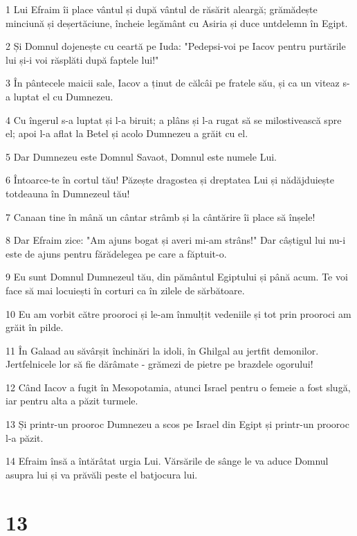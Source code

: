 \par 1 Lui Efraim îi place vântul și după vântul de răsărit aleargă; grămădește minciună și deșertăciune, încheie legământ cu Asiria și duce untdelemn în Egipt.
\par 2 Și Domnul dojenește cu ceartă pe Iuda: "Pedepsi-voi pe Iacov pentru purtările lui și-i voi răsplăti după faptele lui!"
\par 3 În pântecele maicii sale, Iacov a ținut de călcâi pe fratele său, și ca un viteaz s-a luptat el cu Dumnezeu.
\par 4 Cu îngerul s-a luptat și l-a biruit; a plâns și l-a rugat să se milostivească spre el; apoi l-a aflat la Betel și acolo Dumnezeu a grăit cu el.
\par 5 Dar Dumnezeu este Domnul Savaot, Domnul este numele Lui.
\par 6 Întoarce-te în cortul tău! Păzește dragostea și dreptatea Lui și nădăjduiește totdeauna în Dumnezeul tău!
\par 7 Canaan tine în mână un cântar strâmb și la cântărire îi place să înșele!
\par 8 Dar Efraim zice: "Am ajuns bogat și averi mi-am strâns!" Dar câștigul lui nu-i este de ajuns pentru fărădelegea pe care a făptuit-o.
\par 9 Eu sunt Domnul Dumnezeul tău, din pământul Egiptului și până acum. Te voi face să mai locuiești în corturi ca în zilele de sărbătoare.
\par 10 Eu am vorbit către prooroci și le-am înmulțit vedeniile și tot prin prooroci am grăit în pilde.
\par 11 În Galaad au săvârșit închinări la idoli, în Ghilgal au jertfit demonilor. Jertfelnicele lor să fie dărâmate - grămezi de pietre pe brazdele ogorului!
\par 12 Când Iacov a fugit în Mesopotamia, atunci Israel pentru o femeie a fost slugă, iar pentru alta a păzit turmele.
\par 13 Și printr-un prooroc Dumnezeu a scos pe Israel din Egipt și printr-un prooroc l-a păzit.
\par 14 Efraim însă a întărâtat urgia Lui. Vărsările de sânge le va aduce Domnul asupra lui și va prăvăli peste el batjocura lui.

\chapter{13}

